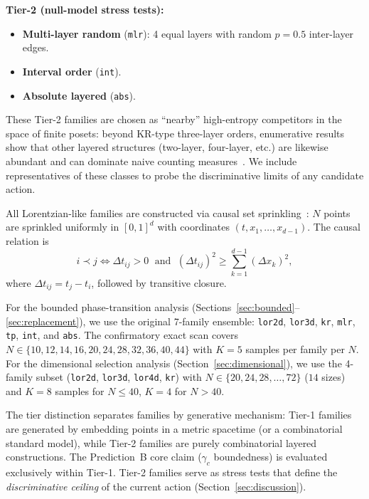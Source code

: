 \documentclass[12pt,a4paper]{article}
\begin{document}
\noindent\textbf{Tier-2 (null-model stress tests):}
\begin{itemize}[nosep]
\item \textbf{Multi-layer random} (\texttt{mlr}): 4 equal layers with random
$p = 0.5$ inter-layer edges.
\item \textbf{Interval order} (\texttt{int}).
\item \textbf{Absolute layered} (\texttt{abs}).
\end{itemize}

These Tier-2 families are chosen as ``nearby'' high-entropy competitors in the
space of finite posets: beyond KR-type three-layer orders, enumerative results
show that other layered structures (two-layer, four-layer, etc.) are likewise
abundant and can dominate naive counting measures~\cite{promel2001}. We include
representatives of these classes to probe the discriminative limits of any
candidate action.

All Lorentzian-like families are constructed via causal set
sprinkling~\cite{bombelli1987}: $N$ points are sprinkled uniformly in $[0,1]^d$
with coordinates $(t, x_1, \ldots, x_{d-1})$. The causal relation is
\begin{equation}
    i \prec j \iff \Delta t_{ij} > 0 \;\text{ and }\;
    (\Delta t_{ij})^2 \geq \sum_{k=1}^{d-1} (\Delta x_k)^2,
    \label{eq:causal}
\end{equation}
where $\Delta t_{ij} = t_j - t_i$, followed by transitive closure.

For the bounded phase-transition analysis
(Sections~\ref{sec:bounded}--\ref{sec:replacement}), we use the original
7-family ensemble: \texttt{lor2d}, \texttt{lor3d}, \texttt{kr},
\texttt{mlr}, \texttt{tp}, \texttt{int}, and \texttt{abs}. The confirmatory
exact scan covers $N \in \{10, 12, 14, 16, 20, 24, 28, 32, 36, 40, 44\}$ with
$K = 5$ samples per family per $N$. For the dimensional selection analysis
(Section~\ref{sec:dimensional}), we use the 4-family subset (\texttt{lor2d},
\texttt{lor3d}, \texttt{lor4d}, \texttt{kr}) with
$N \in \{20, 24, 28, \ldots, 72\}$ ($14$ sizes) and $K = 8$ samples for
$N \leq 40$, $K = 4$ for $N > 40$.

The tier distinction separates families by generative mechanism:
Tier-1 families are generated by embedding points in a metric spacetime (or a
combinatorial standard model), while Tier-2 families are purely combinatorial
layered constructions. The Prediction~B core claim ($\gamma_c$ boundedness) is
evaluated exclusively within Tier-1. Tier-2 families serve as stress tests that
define the \emph{discriminative ceiling} of the current action
(Section~\ref{sec:discussion}).
\end{document}
